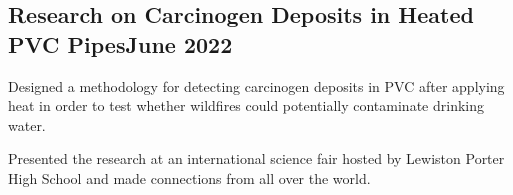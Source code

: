 \documentclass[a4paper, 12pt]{article}
\begin{document}
\subsection {{Research on Carcinogen Deposits in Heated PVC Pipes}\hfill June 2022}
\begin{zitemize}
\item Designed a methodology for detecting carcinogen deposits in PVC after applying heat in order to test whether wildfires could potentially contaminate drinking water. 
\item Presented the research at an international science fair hosted by Lewiston Porter High School and made connections from all over the world. 
\end{zitemize}
\end{document}
